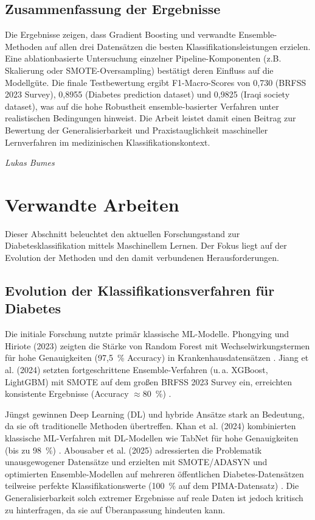 \documentclass[10pt]{scrartcl}
\begin{document}
\subsection{Zusammenfassung der Ergebnisse}
Die Ergebnisse zeigen, dass Gradient Boosting und verwandte Ensemble-Methoden auf allen drei Datensätzen die besten Klassifikationsleistungen erzielen. Eine ablationbasierte Untersuchung einzelner Pipeline-Komponenten (z.B. Skalierung oder SMOTE-Oversampling) bestätigt deren Einfluss auf die Modellgüte. Die finale Testbewertung ergibt F1-Macro-Scores von 0{,}730 (BRFSS 2023 Survey), 0{,}8955 (Diabetes prediction dataset) und 0{,}9825 (Iraqi society dataset), was auf die hohe Robustheit ensemble-basierter Verfahren unter realistischen Bedingungen hinweist. Die Arbeit leistet damit einen Beitrag zur Bewertung der Generalisierbarkeit und Praxistauglichkeit maschineller Lernverfahren im medizinischen Klassifikationskontext.


\begin{flushright}
  \footnotesize\textit{Lukas Bumes}
\end{flushright}




\section{Verwandte Arbeiten}
Dieser Abschnitt beleuchtet den aktuellen Forschungsstand zur Diabetesklassifikation mittels Maschinellem Lernen. Der Fokus liegt auf der Evolution der Methoden und den damit verbundenen Herausforderungen.

\subsection{Evolution der Klassifikationsverfahren für Diabetes}

Die initiale Forschung nutzte primär klassische ML-Modelle. Phongying und Hiriote (2023) zeigten die Stärke von Random Forest mit Wechselwirkungstermen für hohe Genauigkeiten (97,5~\% Accuracy) in Krankenhausdatensätzen \cite{Phongying2023}. Jiang et al. (2024) setzten fortgeschrittene Ensemble-Verfahren (u.\,a. XGBoost, LightGBM) mit SMOTE auf dem großen BRFSS 2023 Survey ein, erreichten konsistente Ergebnisse (Accuracy $\approx 80$~\%) \cite{Jiang2024}.

Jüngst gewinnen Deep Learning (DL) und hybride Ansätze stark an Bedeutung, da sie oft traditionelle Methoden übertreffen. Khan et al. (2024) kombinierten klassische ML-Verfahren mit DL-Modellen wie TabNet für hohe Genauigkeiten (bis zu 98~\%) \cite{Khan2024}. Abousaber et al. (2025) adressierten die Problematik unausgewogener Datensätze und erzielten mit SMOTE/ADASYN und optimierten Ensemble-Modellen auf mehreren öffentlichen Diabetes-Datensätzen teilweise perfekte Klassifikationswerte (100~\% auf dem PIMA-Datensatz) \cite{Abousaber2025}. Die Generalisierbarkeit solch extremer Ergebnisse auf reale Daten ist jedoch kritisch zu hinterfragen, da sie auf Überanpassung hindeuten kann.
\end{document}
